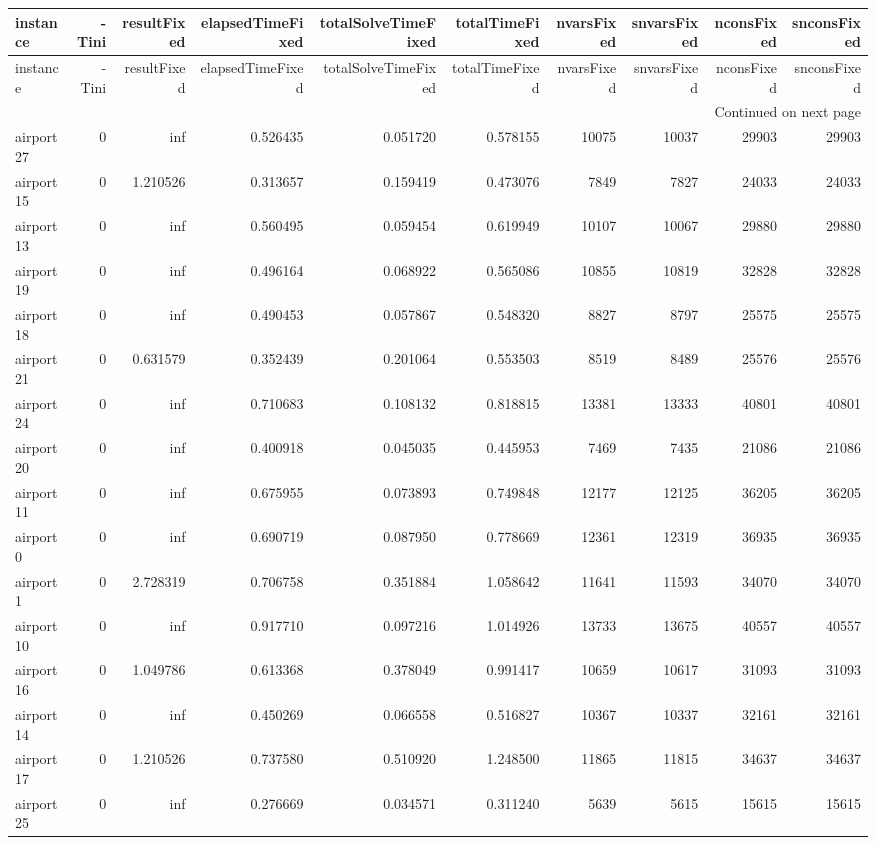 \begin{longtable}{|l|r|r|r|r|r|r|r|r|r|}
\toprule
instance & -Tini & resultFixed & elapsedTimeFixed & totalSolveTimeFixed & totalTimeFixed & nvarsFixed & snvarsFixed & nconsFixed & snconsFixed \\
\midrule
\endfirsthead
\toprule
instance & -Tini & resultFixed & elapsedTimeFixed & totalSolveTimeFixed & totalTimeFixed & nvarsFixed & snvarsFixed & nconsFixed & snconsFixed \\
\midrule
\endhead
\midrule
\multicolumn{10}{r}{Continued on next page} \\
\midrule
\endfoot
\bottomrule
\endlastfoot
airport27 & 0 & inf & 0.526435 & 0.051720 & 0.578155 & 10075 & 10037 & 29903 & 29903 \\
airport15 & 0 & 1.210526 & 0.313657 & 0.159419 & 0.473076 & 7849 & 7827 & 24033 & 24033 \\
airport13 & 0 & inf & 0.560495 & 0.059454 & 0.619949 & 10107 & 10067 & 29880 & 29880 \\
airport19 & 0 & inf & 0.496164 & 0.068922 & 0.565086 & 10855 & 10819 & 32828 & 32828 \\
airport18 & 0 & inf & 0.490453 & 0.057867 & 0.548320 & 8827 & 8797 & 25575 & 25575 \\
airport21 & 0 & 0.631579 & 0.352439 & 0.201064 & 0.553503 & 8519 & 8489 & 25576 & 25576 \\
airport24 & 0 & inf & 0.710683 & 0.108132 & 0.818815 & 13381 & 13333 & 40801 & 40801 \\
airport20 & 0 & inf & 0.400918 & 0.045035 & 0.445953 & 7469 & 7435 & 21086 & 21086 \\
airport11 & 0 & inf & 0.675955 & 0.073893 & 0.749848 & 12177 & 12125 & 36205 & 36205 \\
airport0 & 0 & inf & 0.690719 & 0.087950 & 0.778669 & 12361 & 12319 & 36935 & 36935 \\
airport1 & 0 & 2.728319 & 0.706758 & 0.351884 & 1.058642 & 11641 & 11593 & 34070 & 34070 \\
airport10 & 0 & inf & 0.917710 & 0.097216 & 1.014926 & 13733 & 13675 & 40557 & 40557 \\
airport16 & 0 & 1.049786 & 0.613368 & 0.378049 & 0.991417 & 10659 & 10617 & 31093 & 31093 \\
airport14 & 0 & inf & 0.450269 & 0.066558 & 0.516827 & 10367 & 10337 & 32161 & 32161 \\
airport17 & 0 & 1.210526 & 0.737580 & 0.510920 & 1.248500 & 11865 & 11815 & 34637 & 34637 \\
airport25 & 0 & inf & 0.276669 & 0.034571 & 0.311240 & 5639 & 5615 & 15615 & 15615 \\

\end{longtable}
